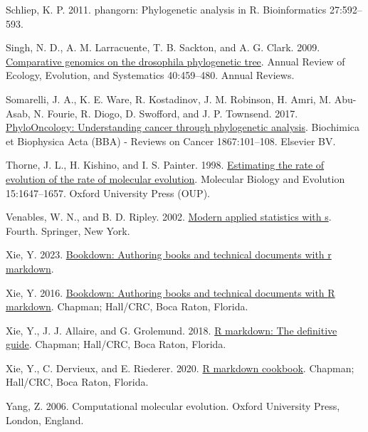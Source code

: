 \documentclass[fleqn,10pt,lineno]{wlpeerj} %
\newlength{\cslhangindent}
\newenvironment{CSLReferences}[2] %
 {\begin{list}{}{%
  \setlength{\itemindent}{0pt}
  \setlength{\leftmargin}{0pt}
  \setlength{\parsep}{0pt}
  \ifodd #1
   \setlength{\leftmargin}{\cslhangindent}
   \setlength{\itemindent}{-1\cslhangindent}
  \fi
  \setlength{\itemsep}{#2\baselineskip}}}
 {\end{list}}
\begin{document}
\begin{CSLReferences}{1}{0}
Schliep, K. P. 2011. {phangorn}: Phylogenetic analysis in {R}. Bioinformatics 27:592--593.

Singh, N. D., A. M. Larracuente, T. B. Sackton, and A. G. Clark. 2009. \href{https://doi.org/10.1146/annurev.ecolsys.110308.120214}{Comparative genomics on the drosophila phylogenetic tree}. Annual Review of Ecology, Evolution, and Systematics 40:459--480. Annual Reviews.

Somarelli, J. A., K. E. Ware, R. Kostadinov, J. M. Robinson, H. Amri, M. Abu-Asab, N. Fourie, R. Diogo, D. Swofford, and J. P. Townsend. 2017. \href{https://doi.org/10.1016/j.bbcan.2016.10.006}{PhyloOncology: Understanding cancer through phylogenetic analysis}. Biochimica et Biophysica Acta (BBA) - Reviews on Cancer 1867:101--108. Elsevier BV.

Thorne, J. L., H. Kishino, and I. S. Painter. 1998. \href{https://doi.org/10.1093/oxfordjournals.molbev.a025892}{Estimating the rate of evolution of the rate of molecular evolution}. Molecular Biology and Evolution 15:1647--1657. Oxford University Press (OUP).

Venables, W. N., and B. D. Ripley. 2002. \href{https://www.stats.ox.ac.uk/pub/MASS4/}{Modern applied statistics with s}. Fourth. Springer, New York.

Xie, Y. 2023. \href{https://github.com/rstudio/bookdown}{Bookdown: Authoring books and technical documents with r markdown}.

Xie, Y. 2016. \href{https://bookdown.org/yihui/bookdown}{Bookdown: Authoring books and technical documents with {R} markdown}. Chapman; Hall/CRC, Boca Raton, Florida.

Xie, Y., J. J. Allaire, and G. Grolemund. 2018. \href{https://bookdown.org/yihui/rmarkdown}{R markdown: The definitive guide}. Chapman; Hall/CRC, Boca Raton, Florida.

Xie, Y., C. Dervieux, and E. Riederer. 2020. \href{https://bookdown.org/yihui/rmarkdown-cookbook}{R markdown cookbook}. Chapman; Hall/CRC, Boca Raton, Florida.

Yang, Z. 2006. Computational molecular evolution. Oxford University Press, London, England.


\end{CSLReferences}
\end{document}
